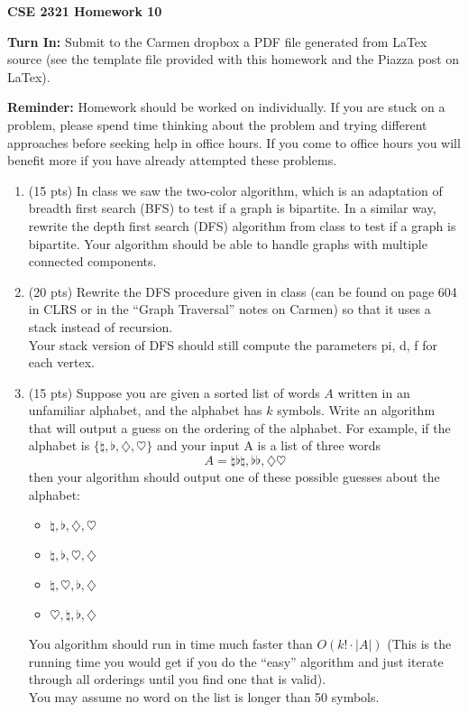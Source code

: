 \documentclass[14pt]{extarticle}
\begin{document}
\textbf{CSE 2321 Homework 10}

\textbf{Turn In:} Submit to the Carmen dropbox a PDF file generated from LaTex source (see the template file provided with this homework and the Piazza post on LaTex).

\textbf{Reminder:} Homework should be worked on individually. If you are stuck on a problem, please spend time thinking about the problem and trying different approaches before seeking help in office hours. If you come to office hours you will benefit more if you have already attempted these problems. 

\begin{enumerate}

\item (15 pts) In class we saw the two-color algorithm, which is an adaptation of breadth first search (BFS) to test if a graph is bipartite. In a similar way, rewrite the depth first search (DFS) algorithm from class to test if a graph is bipartite. Your algorithm should be able to handle graphs with multiple connected components.


\item (20 pts) Rewrite the DFS procedure given in class (can be found on page 604 in CLRS or in the ``Graph Traversal'' notes on Carmen) so that it uses a stack instead of recursion.\\
Your stack version of DFS should still compute the parameters pi, d, f for each  vertex.


\item (15 pts) Suppose you are given a sorted list of words $A$ written in an unfamiliar alphabet, and the alphabet has $k$ symbols. Write an algorithm that will output a guess on the ordering of the alphabet. For example, if the alphabet is $\{\natural, \flat, \diamondsuit, \heartsuit\}$ and your input A is a list of three words 
\[
A = \natural \flat \natural, \flat \flat, \diamondsuit \heartsuit
\]
then your algorithm should output one of these possible guesses about the alphabet:
\begin{itemize}
\item $\natural, \flat, \diamondsuit, \heartsuit$
\item $\natural, \flat, \heartsuit, \diamondsuit$
\item $\natural, \heartsuit, \flat, \diamondsuit$
\item $\heartsuit, \natural, \flat, \diamondsuit$
\end{itemize}
You algorithm should run in time much faster than $O\left(k! \cdot |A|\right)$ (This is the running time you would get if you do the ``easy'' algorithm and just iterate through all orderings until you find one that is valid).\\
You may assume no word on the list is longer than 50 symbols.

\end{enumerate}
\end{document}
